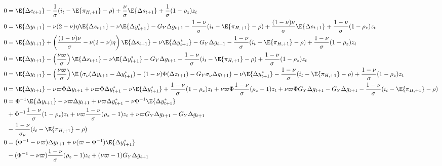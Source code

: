 \begin{align*}
    0 &= \E \{ \Delta c_{t+1}\} - \frac{1}{\sigma}(i_t - \E \{ \pi_{H,+1}\} - \rho) + \frac{\nu}{\sigma}\E \{ \Delta s_{t+1} \} + \frac{1}{\sigma}(1-\rho_z)z_t \\
    0  &= \E \{ \Delta y_{t+1}\}  - \nu(2-\nu)\eta \E \{\Delta s_{t+1} \} - \nu \E \{\Delta y_{t+1}^* \} -G_Y \Delta g_{t+1} - \frac{1-\nu}{\sigma}(i_t - \E \{ \pi_{H,+1}\} - \rho) + \frac{(1-\nu)\nu}{\sigma}\E \{ \Delta s_{t+1} \} + \frac{1-\nu}{\sigma}(1-\rho_z)z_t \\
    0  &= \E \{ \Delta y_{t+1}\}  + \left(\frac{(1-\nu)\nu}{\sigma} - \nu(2-\nu)\eta\right) \E \{\Delta s_{t+1} \} - \nu \E \{\Delta y_{t+1}^* \} -G_Y \Delta g_{t+1} - \frac{1-\nu}{\sigma}(i_t - \E \{ \pi_{H,+1}\} - \rho)  + \frac{1-\nu}{\sigma}(1-\rho_z)z_t \\
    0  &= \E \{ \Delta y_{t+1}\}  - \left(\frac{\nu \varpi}{\sigma}\right) \E \{\Delta s_{t+1} \} - \nu \E \{\Delta y_{t+1}^* \} -G_Y \Delta g_{t+1} - \frac{1-\nu}{\sigma}(i_t - \E \{ \pi_{H,+1}\} - \rho)  + \frac{1-\nu}{\sigma}(1-\rho_z)z_t \\
    0  &= \E \{ \Delta y_{t+1}\}  - \left(\frac{\nu \varpi}{\sigma}\right) \E \left( \sigma_\nu(\Delta y_{t+1} - \Delta y^*_{t+1}) - (1-\nu)\Phi (\Delta z_{t+1}) - G_Y \sigma_\nu \Delta g_{t+1} \right) - \nu \E \{\Delta y_{t+1}^* \} - \frac{1-\nu}{\sigma}(i_t - \E \{ \pi_{H,+1}\} - \rho)  + \frac{1-\nu}{\sigma}(1-\rho_z)z_t \\
    0  &= \E \{ \Delta y_{t+1}\} -\nu \varpi \Phi \Delta y_{t+1} + \nu \varpi \Phi \Delta y^*_{t+1} - \nu \E \{\Delta y_{t+1}^* \} + \frac{1-\nu}{\sigma}(1-\rho_z)z_t + \nu \varpi \Phi \frac{1-\nu}{\sigma} (\rho_z - 1)z_t + \nu \varpi\Phi G_Y \Delta g_{t+1} -G_Y \Delta g_{t+1} - \frac{1-\nu}{\sigma}(i_t - \E \{ \pi_{H,+1}\} - \rho)\\
    0  &= \Phi^{-1} \E \{ \Delta y_{t+1}\} -\nu \varpi \Delta y_{t+1} + \nu \varpi \Delta y^*_{t+1} - \nu \Phi^{-1} \E \{\Delta y_{t+1}^* \} \\
        &  +\Phi^{-1} \frac{1-\nu}{\sigma}(1-\rho_z)z_t + \nu \varpi \frac{1-\nu}{\sigma} (\rho_z - 1)z_t + \nu \varpi G_Y \Delta g_{t+1} -G_Y \Delta g_{t+1}\\
        &- \frac{1-\nu}{\sigma_\nu}(i_t - \E \{ \pi_{H,+1}\} - \rho)\\
    0  &= (\Phi^{-1} -\nu \varpi) \Delta y_{t+1} + \nu (\varpi - \Phi^{-1})\E \{\Delta y_{t+1}^* \} \\
        &  -(\Phi^{-1} -\nu \varpi)\frac{1-\nu}{\sigma} (\rho_z - 1)z_t + (\nu \varpi  - 1) G_Y \Delta g_{t+1}\\

\end{align*}
